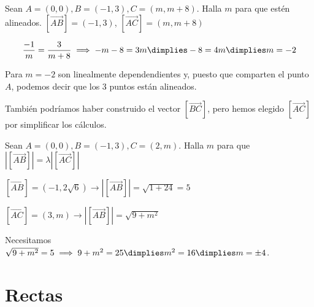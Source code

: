 \begin{problem}
Sean $A=(0,0),B=(-1,3),C=(m,m+8)$. Halla $m$ para que estén alineados.
\solution
$[\vec{AB}] = (-1,3)$, $[\vec{AC}] = (m,m+8)$

\[
	\frac{-1}{m} = \frac{3}{m+8} \implies -m-8 = 3m \dimplies -8=4m \dimplies m=-2
\]

Para $m=-2$ son linealmente dependendientes y, puesto que comparten el punto $A$, podemos decir que los 3 puntos están alineados.

\obs También podríamos haber construido el vector $[\vec{BC}]$, pero hemos elegido $[\vec{AC}]$ por simplificar los cálculos.
\end{problem}

\begin{problem}
Sean $A=(0,0),B=(-1,3),C=(2,m)$. Halla $m$ para que $|[\vec{AB}]| = λ|[\vec{AC}]|$
\solution

$[\vec{AB}] = (-1,2\sqrt{6}) \to |[\vec{AB}]| = \sqrt{1+24}=5$

$[\vec{AC}] = (3,m) \to |[\vec{AB}]| = \sqrt{9+m^2}$

Necesitamos $\sqrt{9+m^2} = 5 \implies 9+m^2 = 25 \dimplies m^2=16 \dimplies m=\pm4$.

\end{problem}


\section{Rectas}






